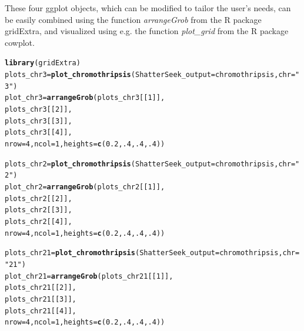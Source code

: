 \documentclass[twoside,a4wide,11pt]{article}\usepackage[]{graphicx}\usepackage[]{color}
\makeatletter
\newcommand{\hlnum}[1]{\textcolor[rgb]{0.686,0.059,0.569}{#1}}%
\newcommand{\hlstr}[1]{\textcolor[rgb]{0.192,0.494,0.8}{#1}}%
\newcommand{\hlstd}[1]{\textcolor[rgb]{0.345,0.345,0.345}{#1}}%
\newcommand{\hlkwb}[1]{\textcolor[rgb]{0.69,0.353,0.396}{#1}}%
\newcommand{\hlkwc}[1]{\textcolor[rgb]{0.333,0.667,0.333}{#1}}%
\newcommand{\hlkwd}[1]{\textcolor[rgb]{0.737,0.353,0.396}{\textbf{#1}}}%
\newenvironment{kframe}{%
 \def\at@end@of@kframe{}%
 \ifinner\ifhmode%
  \def\at@end@of@kframe{\end{minipage}}%
  \begin{minipage}{\columnwidth}%
 \fi\fi%
 \def\FrameCommand##1{\hskip\@totalleftmargin \hskip-\fboxsep
 \colorbox{shadecolor}{##1}\hskip-\fboxsep
     \hskip-\linewidth \hskip-\@totalleftmargin \hskip\columnwidth}%
 \MakeFramed {\advance\hsize-\width
   \@totalleftmargin\z@ \linewidth\hsize
   \@setminipage}}%
 {\par\unskip\endMakeFramed%
 \at@end@of@kframe}
\newenvironment{knitrout}{}{} %
\makeatother
\begin{document}
These four ggplot objects, which can be modified to tailor the user's needs, 
can be easily combined using the function {\it arrangeGrob} from the R package gridExtra,
and visualized using e.g. the function {\it plot\_grid} from the R package cowplot.

\begin{knitrout}
\color{fgcolor}\begin{kframe}
\begin{alltt}
\hlkwd{library}\hlstd{(gridExtra)}
\hlstd{plots_chr3} \hlkwb{=} \hlkwd{plot_chromothripsis}\hlstd{(}\hlkwc{ShatterSeek_output} \hlstd{= chromothripsis,}\hlkwc{chr} \hlstd{=} \hlstr{"3"}\hlstd{)}
\hlstd{plot_chr3} \hlkwb{=} \hlkwd{arrangeGrob}\hlstd{(plots_chr3[[}\hlnum{1}\hlstd{]],}
                        \hlstd{plots_chr3[[}\hlnum{2}\hlstd{]],}
                        \hlstd{plots_chr3[[}\hlnum{3}\hlstd{]],}
                        \hlstd{plots_chr3[[}\hlnum{4}\hlstd{]],}
                        \hlkwc{nrow}\hlstd{=}\hlnum{4}\hlstd{,}\hlkwc{ncol}\hlstd{=}\hlnum{1}\hlstd{,}\hlkwc{heights}\hlstd{=}\hlkwd{c}\hlstd{(}\hlnum{0.2}\hlstd{,}\hlnum{.4}\hlstd{,}\hlnum{.4}\hlstd{,}\hlnum{.4}\hlstd{))}

\hlstd{plots_chr2} \hlkwb{=} \hlkwd{plot_chromothripsis}\hlstd{(}\hlkwc{ShatterSeek_output} \hlstd{= chromothripsis,}\hlkwc{chr} \hlstd{=} \hlstr{"2"}\hlstd{)}
\hlstd{plot_chr2} \hlkwb{=} \hlkwd{arrangeGrob}\hlstd{(plots_chr2[[}\hlnum{1}\hlstd{]],}
                        \hlstd{plots_chr2[[}\hlnum{2}\hlstd{]],}
                        \hlstd{plots_chr2[[}\hlnum{3}\hlstd{]],}
                        \hlstd{plots_chr2[[}\hlnum{4}\hlstd{]],}
                         \hlkwc{nrow}\hlstd{=}\hlnum{4}\hlstd{,}\hlkwc{ncol}\hlstd{=}\hlnum{1}\hlstd{,}\hlkwc{heights}\hlstd{=}\hlkwd{c}\hlstd{(}\hlnum{0.2}\hlstd{,}\hlnum{.4}\hlstd{,}\hlnum{.4}\hlstd{,}\hlnum{.4}\hlstd{))}

\hlstd{plots_chr21} \hlkwb{=} \hlkwd{plot_chromothripsis}\hlstd{(}\hlkwc{ShatterSeek_output} \hlstd{= chromothripsis,}\hlkwc{chr} \hlstd{=} \hlstr{"21"}\hlstd{)}
\hlstd{plot_chr21} \hlkwb{=} \hlkwd{arrangeGrob}\hlstd{(plots_chr21[[}\hlnum{1}\hlstd{]],}
                         \hlstd{plots_chr21[[}\hlnum{2}\hlstd{]],}
                         \hlstd{plots_chr21[[}\hlnum{3}\hlstd{]],}
                         \hlstd{plots_chr21[[}\hlnum{4}\hlstd{]],}
                         \hlkwc{nrow}\hlstd{=}\hlnum{4}\hlstd{,}\hlkwc{ncol}\hlstd{=}\hlnum{1}\hlstd{,}\hlkwc{heights}\hlstd{=}\hlkwd{c}\hlstd{(}\hlnum{0.2}\hlstd{,}\hlnum{.4}\hlstd{,}\hlnum{.4}\hlstd{,}\hlnum{.4}\hlstd{))}


\end{alltt}
\end{kframe}
\end{knitrout}
\end{document}
